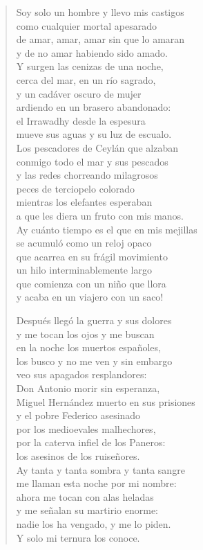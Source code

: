 \documentclass[12pt]{article}
\begin{document}
\begin{verse}
Soy solo un hombre y llevo mis castigos\\
como cualquier mortal apesarado\\
de amar, amar, amar sin que lo amaran\\
y de no amar habiendo sido amado.\\
Y surgen las cenizas de una noche,\\
cerca del mar, en un río sagrado,\\
y un cadáver oscuro de mujer\\
ardiendo en un brasero abandonado:\\
el Irrawadhy desde la espesura\\
mueve sus aguas y su luz de escualo.\\
Los pescadores de Ceylán que alzaban\\
conmigo todo el mar y sus pescados\\
y las redes chorreando milagrosos\\
peces de terciopelo colorado\\
mientras los elefantes esperaban\\
a que les diera un fruto con mis manos.\\
Ay cuánto tiempo es el que en mis mejillas\\
se acumuló como un reloj opaco\\
que acarrea en su frágil movimiento\\
un hilo interminablemente largo\\
que comienza con un niño que llora\\
y acaba en un viajero con un saco!  

Después llegó la guerra y sus dolores\\
y me tocan los ojos y me buscan\\
en la noche los muertos españoles,\\
los busco y no me ven y sin embargo\\
veo sus apagados resplandores:\\
Don Antonio morir sin esperanza,\\
Miguel Hernández muerto en sus prisiones\\
y el pobre Federico asesinado\\
por los medioevales malhechores,\\
por la caterva infiel de los Paneros:\\
los asesinos de los ruiseñores.\\
Ay tanta y tanta sombra y tanta sangre\\
me llaman esta noche por mi nombre:\\
ahora me tocan con alas heladas\\
y me señalan su martirio enorme:\\
nadie los ha vengado, y me lo piden.\\
Y solo mi ternura los conoce.  


\end{verse}
\end{document}
